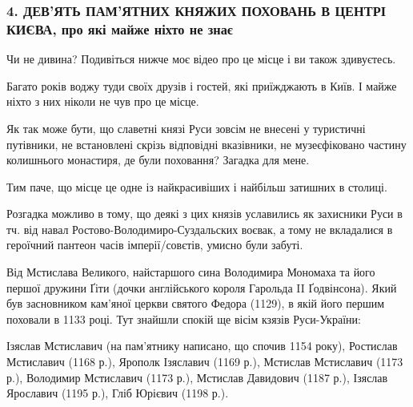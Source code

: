  
 
 
 
 
\subsubsection{4. ДЕВ'ЯТЬ ПАМ'ЯТНИХ КНЯЖИХ ПОХОВАНЬ В ЦЕНТРІ КИЄВА, про які майже ніхто не знає}

Чи не дивина? Подивіться нижче моє відео про це місце і ви також здивуєтесь.

Багато років воджу туди своїх друзів і гостей, які приїжджають в Київ. І майже
ніхто з них ніколи не чув про це місце.

Як так може бути, що славетні князі Руси зовсім не внесені у туристичні
путівники, не встановлені скрізь відповідні вказівники, не музеєфіковано
частину колишнього монастиря, де були поховання? Загадка для мене. 


Тим паче, що місце це одне із найкрасивіших і найбільш затишних в столиці. 

Розгадка можливо в тому, що деякі з цих князів уславились як захисники Руси в
тч. від навал Ростово-Володимиро-Суздальских воєвак, а тому не вкладалися в
героїчний пантеон часів імперії/совєтів, умисно були забуті.


Від Мстислава Великого, найстаршого сина Володимира Мономаха та його першої
дружини Ґіти (дочки англійського короля Гарольда II Ґодвінсона). Який був
засновником кам'яної церкви святого Федора (1129), в якій його першим поховали
в 1133 році. Тут знайшли спокій ще вісім кзязів Руси-України: 

Ізяслав Мстиславич (на пам’ятнику написано, що спочив 1154 року), Ростислав
Мстиславич (1168 р.), Ярополк Ізяславич (1169 р.), Мстислав Мстиславич (1173
р.), Володимир Мстиславич (1173 р.), Мстислав Давидович (1187 р.), Ізяслав
Ярославич (1195 р.), Гліб Юрієвич (1198 р.). 


